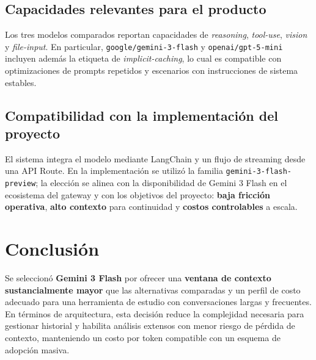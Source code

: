 \subsection{Capacidades relevantes para el producto}
Los tres modelos comparados reportan capacidades de \textit{reasoning}, \textit{tool-use}, \textit{vision} y \textit{file-input}. En particular, \texttt{google/gemini-3-flash} y \texttt{openai/gpt-5-mini} incluyen además la etiqueta de \textit{implicit-caching}, lo cual es compatible con optimizaciones de prompts repetidos y escenarios con instrucciones de sistema estables.

\subsection{Compatibilidad con la implementación del proyecto}
El sistema integra el modelo mediante LangChain y un flujo de streaming desde una API Route. En la implementación se utilizó la familia \texttt{gemini-3-flash-preview}; la elección se alinea con la disponibilidad de Gemini 3 Flash en el ecosistema del gateway y con los objetivos del proyecto: \textbf{baja fricción operativa}, \textbf{alto contexto} para continuidad y \textbf{costos controlables} a escala.

\section{Conclusión}
Se seleccionó \textbf{Gemini 3 Flash} por ofrecer una \textbf{ventana de contexto sustancialmente mayor} que las alternativas comparadas y un perfil de costo adecuado para una herramienta de estudio con conversaciones largas y frecuentes. En términos de arquitectura, esta decisión reduce la complejidad necesaria para gestionar historial y habilita análisis extensos con menor riesgo de pérdida de contexto, manteniendo un costo por token compatible con un esquema de adopción masiva.
